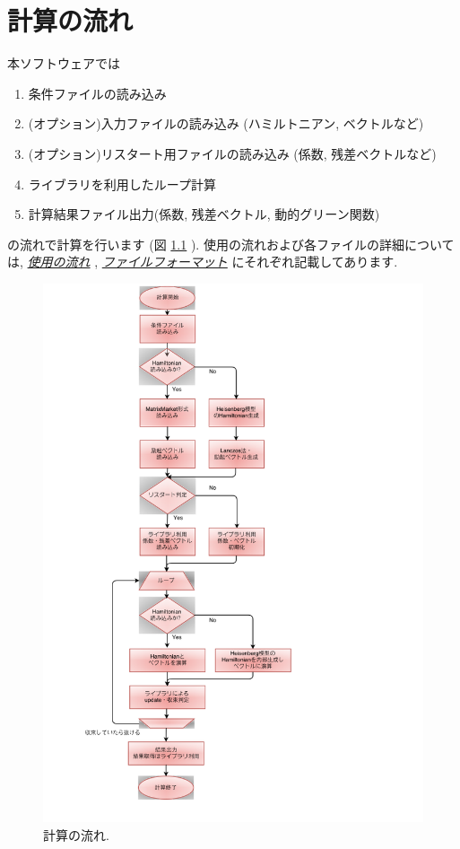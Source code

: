 \documentclass[letterpaper,10pt,dvipdfmx,openany]{sphinxmanual}
\begin{document}
\chapter{計算の流れ}
\label{shiftk_flow_ja::doc}\label{shiftk_flow_ja:id1}
本ソフトウェアでは
\begin{enumerate}
\item {} 
条件ファイルの読み込み

\item {} 
(オプション)入力ファイルの読み込み (ハミルトニアン, ベクトルなど)

\item {} 
(オプション)リスタート用ファイルの読み込み (係数, 残差ベクトルなど)

\item {} 
ライブラリを利用したループ計算

\item {} 
計算結果ファイル出力(係数, 残差ベクトル, 動的グリーン関数)

\end{enumerate}

の流れで計算を行います
(図 \ref{shiftk_flow_ja:calcflow} ).
使用の流れおよび各ファイルの詳細については, {\hyperref[shiftk_flow_ja:usage]{\emph{使用の流れ}}} ,
{\hyperref[shiftk_format_ja:fileformat]{\emph{ファイルフォーマット}}} にそれぞれ記載してあります.
\begin{figure}[htbp]
\centering
\capstart

\includegraphics{flow.png}
\caption{計算の流れ.}\label{shiftk_flow_ja:calcflow}\end{figure}
\end{document}

